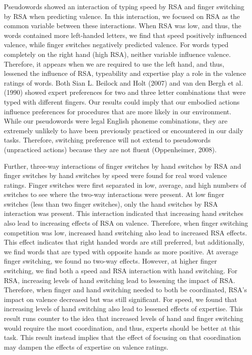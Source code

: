 \documentclass[
  english,
  man]{apa7}
\begin{document}
Pseudowords showed an interaction of typing speed by RSA and finger switching by RSA when predicting valence. In this interaction, we focused on RSA as the common variable between these interactions. When RSA was low, and thus, the words contained more left-handed letters, we find that speed positively influenced valence, while finger switches negatively predicted valence. For words typed completely on the right hand (high RSA), neither variable influence valence. Therefore, it appears when we are required to use the left hand, and thus, lessened the influence of RSA, typeability and expertise play a role in the valence ratings of words. Both Sian L. Beilock and Holt (2007) and van den Bergh et al. (1990) showed expert preferences for two and three letter combinations that were typed with different fingers. Our results could imply that our embodied actions influence preferences for procedures that are more likely in our environment. While our pseudowords were legal English phoneme combinations, they are extremely unlikely to have been previously practiced or encountered in our daily tasks. Therefore, switching preference will not extend to pseudowords (unpracticed actions) because they are not fluent (Oppenheimer, 2008).

Further, three-way interactions of finger switches by hand switches by RSA and finger switches by hand switches by speed were found for real word valence ratings. Finger switches were first separated in low, average, and high numbers of switches to see where the two-way interactions were present. At low finger switches (less than two finger switches), only the hand switches by RSA interaction was present. This interaction indicated that increasing hand switches also lead to increasing effects of RSA on valence. Therefore, when finger switching competition was low, increased hand switching also lead to increased RSA effects. This effect indicates that right handed words are still preferred, but additionally, we find words that are typed with opposite hands as more positive. At average finger switching, we found no two-way effects. However, at higher finger switching, we find both a speed and RSA interaction with hand switching. For RSA, increasing levels of hand switching lead to lessening the impact of RSA. Therefore, when finger and hand switching needed to both be coordinated, RSA's impact on valence decreased but was still significant. For speed, we found that increasing levels of hand switching also lead to lessened effects of expertise. This result runs counter to the idea that increased levels of hand and finger switching would require the most coordination, and thus, experts should be better at this task. This result instead implies that the effect of focusing on that coordination may dampen the effects of expertise on valence ratings.
\end{document}
